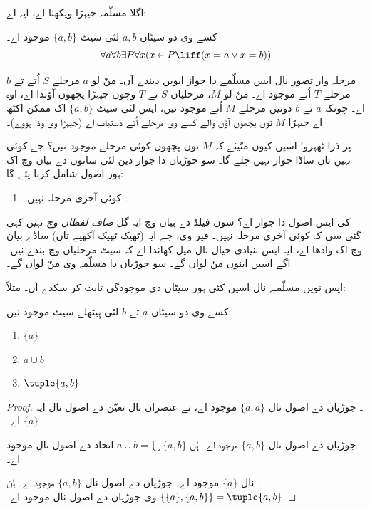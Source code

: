 \documentclass[../../../include/open-logic-section]{subfiles}
\begin{document}

اگلا مسلّمہ جیہڑا ویکھنا اے، ایہ اے:

\begin{axiom}[جوڑیاں]
کسے وی دو سیٹاں $a, b$ لئی سیٹ $\{a, b\}$ موجود اے۔
\[
	\forall a \forall b \exists P \forall x (x \in P \liff (x = a \lor x = b))
\]
\end{axiom}

مرحلہ وار تصور نال ایس مسلّمے دا جواز ایویں دیندے آں۔ منّ لو $a$
مرحلے $S$ اُتے تے $b$ مرحلے $T$ اُتے موجود اے۔ منّ لو $M$، مرحلیاں
$S$ تے $T$ وچوں جیہڑا پچھوں آؤندا اے، اوہ اے۔ چونکہ $a$ تے $b$ دونیں
مرحلے $M$ اُتے موجود نیں، ایس لئی سیٹ $\{a,b\}$ اک ممکن اکٹھ اے جیہڑا
$M$ توں پچھوں آؤن والے کسے وی مرحلے اُتے دستیاب اے (جیہڑا وی وڈا ہووے)۔

پر ذرا ٹھہرو!{} اسیں کیوں منّیئے کہ $M$ توں پچھوں کوئی مرحلے
\emph{موجود نیں}؟ جے کوئی نہیں تاں ساڈا جواز نہیں چلے گا۔ سو جوڑیاں دا
جواز دین لئی سانوں  دے بیان وچ اک ہور
اصول شامل کرنا پئے گا:
\begin{enumerate}
	\item[] \stagessucc۔ کوئی آخری مرحلہ نہیں۔
\end{enumerate}
کی ایس اصول دا جواز اے؟ شون فیلڈ دے بیان وچ ایہ گل \emph{صاف لفظاں وچ}
نہیں کہی گئی سی کہ کوئی آخری مرحلہ نہیں۔ فیر وی، جے ایہ (ٹھیک ٹھیک
آکھیے تاں) ساڈے بیان وچ اک وادھا اے، ایہ ایس بنیادی خیال نال میل کھاندا
اے کہ سیٹ مرحلیاں وچ بندے نیں۔ اگے اسیں اینوں منّ لواں گے۔ سو جوڑیاں دا
مسلّمہ وی منّ لواں گے۔

ایس نویں مسلّمے نال اسیں کئی ہور سیٹاں دی موجودگی ثابت کر سکدے آں۔ مثلاً:

\begin{prop}
کسے وی دو سیٹاں $a$ تے $b$ لئی ہِیٹھلے سیٹ موجود نیں:
	\begin{enumerate}
		\item{} $\{a\}$
		\item{} $a \cup b$
		\item{} $\tuple{a, b}$
	\end{enumerate}
\end{prop}

\begin{proof}
۔ جوڑیاں دے اصول نال $\{a, a\}$ موجود اے، تے عنصراں
نال تعیّن دے اصول نال ایہ $\{a\}$ اے۔

۔ جوڑیاں دے اصول نال $\{a, b\}$ موجود اے۔
ہُن $a \cup b = \bigcup \{a, b\}$ اتحاد دے اصول نال موجود اے۔

۔  نال $\{a\}$ موجود اے۔ جوڑیاں دے
اصول نال $\{a, b\}$ موجود اے۔ ہُن $\{\{a\}, \{a, b\}\} = \tuple{a, b}$
وی جوڑیاں دے اصول نال موجود اے۔
\end{proof}
\end{document}
